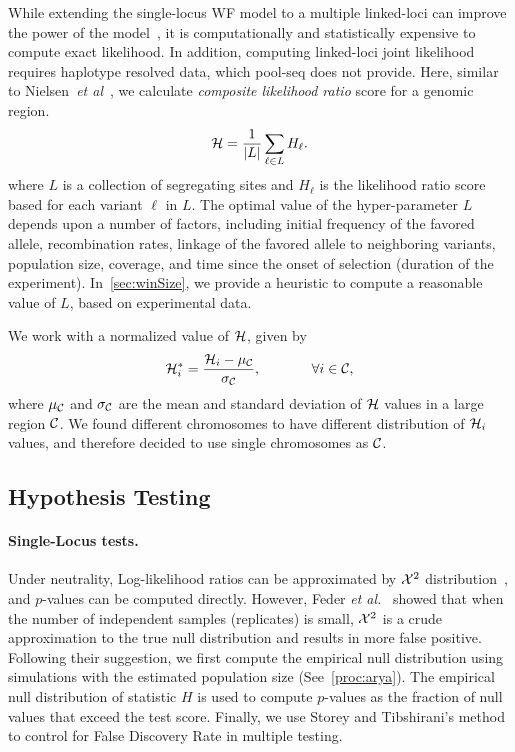 \documentclass[9pt,twocolumn,twoside]{gsajnl}
\begin{document}
While extending the single-locus WF model to a multiple linked-loci
can improve the power of the model~\cite{Terhorst2015Multi}, it is
computationally and statistically expensive to compute exact
likelihood. In addition, computing linked-loci joint likelihood requires  
haplotype resolved data, which pool-seq
does not provide. Here, similar to Nielsen~\emph{et
	al}~\cite{nielsen2005genomic}, we calculate \emph{composite likelihood
	ratio} score for a genomic region.
\begin{equation}
	{\cal H} = \frac{1}{|L|}\sum_{\ell \in L} H_\ell.
	\label{eq:pihmm}
\end{equation}
where $L$ is a collection of segregating sites and $H_\ell$ is the
likelihood ratio score based for each variant $\ell$ in $L$.  The
optimal value of the hyper-parameter $L$ depends upon a number of
factors, including initial frequency of the favored allele,
recombination rates, linkage of the favored allele to neighboring
variants, population size, coverage, and time since the onset of
selection (duration of the experiment). In~\ref{sec:winSize}, we
provide a heuristic to compute a reasonable value of $L$, based on
experimental data. 

We work with a normalized value of ${\cal H}$, given by
\begin{equation} {\cal H}_i^*=\frac{{\cal H}_i-\mu_{\cal C}}{\sigma_{\cal C}},
	\hspace{0.5in} \forall i \in {\cal C},
\end{equation} 
where $\mu_{\cal C}$ and $\sigma_{\cal C}$ are the mean and standard deviation
of ${\cal H}$ values in a large region ${\cal C}$. We found different
chromosomes to have different distribution of ${\cal H}_i$ values, and
therefore decided to use single chromosomes as ${\cal C}$.
\subsection{Hypothesis Testing}
\paragraph{Single-Locus tests.}
Under neutrality, Log-likelihood ratios can be approximated by ${\cal X}^2$
distribution~\cite{williams2001weighing}, and $p$-values can be
computed directly. However, Feder \emph{et
	al.}~\cite{feder2014Identifying} showed that when the number of
independent samples (replicates) is small, ${\cal X}^2$ is a crude
approximation to the true null distribution and results in more false
positive.  Following their suggestion, we first compute the empirical
null distribution using simulations with the estimated population size
(See~\ref{proc:arya}). The empirical null distribution of statistic
$H$ is used to compute $p$-values as the fraction of null values that
exceed the test score.  Finally, we use Storey and Tibshirani's
method~\cite{storey2003statistical} to control for False Discovery
Rate in multiple testing.
\end{document}

